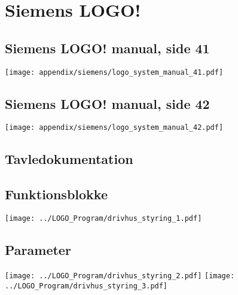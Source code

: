 \newpage
\section{Siemens LOGO!}

\subsection{Siemens LOGO! manual, side 41}
\label{man:logo_side_41}
\texttt{[image: appendix/siemens/logo\_system\_manual\_41.pdf]}

\subsection{Siemens LOGO! manual, side 42}
\label{man:logo_side_42}
\texttt{[image: appendix/siemens/logo\_system\_manual\_42.pdf]}

\subsection{Tavledokumentation}


\subsection{Funktionsblokke}
\texttt{[image: ../LOGO\_Program/drivhus\_styring\_1.pdf]}
\subsection{Parameter}
\texttt{[image: ../LOGO\_Program/drivhus\_styring\_2.pdf]}
\newpage
\texttt{[image: ../LOGO\_Program/drivhus\_styring\_3.pdf]}
%